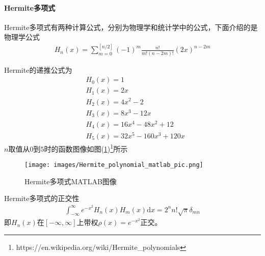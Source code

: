                 \paragraph{Hermite多项式}
                Hermite多项式有两种计算公式，分别为物理学和统计学中的公式，下面介绍的是物理学公式
                \begin{align}
                    \label{eq:Hermite多项式一般形式}
                    H_n(x) = \sum_{m= 0}^{[n/2]}(-1)^m \frac{n!}{m!(n - 2m)!} (2x)^{n-2m}
                \end{align}
                \par
                Hermite的递推公式为
                \begin{align*}
                    &H_0(x)= 1 \\
                    &H_1(x) = 2x\\
                    &H_2(x) = 4x^2 -2\\
                    &H_3(x) = 8x^3 - 12x\\
                    &H_4(x) = 16x^4 - 48x^2 +12\\
                    &H_5 (x) = 32x^5 - 160x^3+120x
                \end{align*}
                $n$取值从$0$到$5$时的函数图像如图(\ref{fig:Hermite多项式MATLAB图像})\footnote{https://en.wikipedia.org/wiki/Hermite\_polynomials}所示
                \begin{figure}[H]
                \centering
                \texttt{[image: images/Hermite\_polynomial\_matlab\_pic.png]}
                \caption{Hermite多项式MATLAB图像}
                \label{fig:Hermite多项式MATLAB图像}
                \end{figure}
                \par
                Hermite多项式的正交性
                \begin{align*}
                    \int_{-\infty}^{\infty} e^{-x^2} H_n(x)H_m(x) \mathrm{d}x  = 2^nn!\sqrt{\pi} \delta_{mn}
                \end{align*}
                即$H_n(x)$在$[-\infty,\infty]$上带权$\rho(x) = e^{-x^2}$正交。

